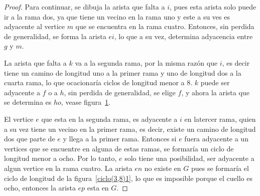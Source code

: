 \documentclass[12pt]{book}
\theoremstyle{definition}
\begin{document}
\begin{proof}
Para continuar, se dibuja la arista que falta
a $i$, pues esta arista solo puede ir a la rama dos, ya que tiene un
vecino en la rama uno y este a su ves es adyacente al vertice $m$ que
se encuentra en la rama cuatro. Entonces, sin perdida de generalidad,
se forma la arista $ei$, lo que a su vez, determina adyacencia entre
$g$ y $m$. 

La arista que falta a $k$ va a la segunda rama, por la
misma razón que $i$, es decir tiene un camino de longitud uno a la
primer rama y uno de longitud dos a la cuarta rama, lo que ocacionaría
ciclos de longitud menor a 8. $k$ puede ser adyacente a $f$ o a $h$,
sin perdida de generalidad, se elige $f$, y ahora la arista que se
determina es $ho$, vease figura~\ref{arbol2(3,8)}.

\begin{figure}
  \centering
  \caption{} \label{arbol2(3,8)}
\end{figure}

El vertice $e$ que esta en la segunda rama, es adyacente a $i$ en
latercer rama, quien a su vez tiene un vecino en la primer rama, es
decir, existe un camino de longitud dos que parte de $e$ y llega a la
primer rama. Entonces si $e$ fuera adyacente a un vertices que se
encuentre en alguna de estas ramas, se formaría un ciclo de longitud
menor a ocho. Por lo tanto, $e$ solo tiene una posibilidad, ser
adyacente a algun vertice en la rama cuatro. La arista $en$  no existe
en $G$ pues se formaría el ciclo de longitud de la
figura~\ref{ciclo(3,8)1}, lo que es imposible porque el cuello es
ocho,  entonces la arista $ep$ esta en $G$.


\end{proof}
\end{document}
